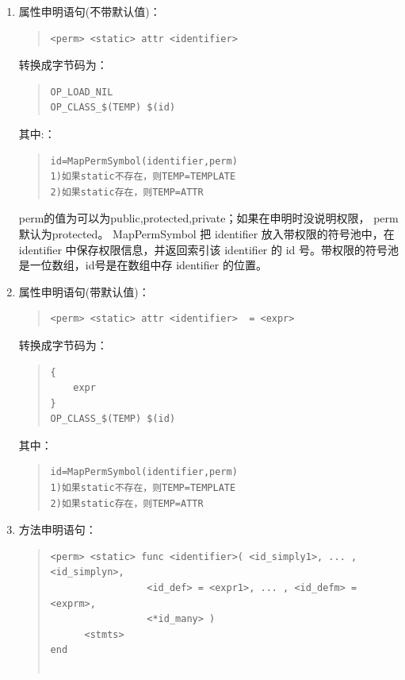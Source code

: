 \begin{enumerate}
\item 属性申明语句(不带默认值)：
\begin{quote}
\begin{verbatim}
<perm> <static> attr <identifier> 
\end{verbatim}
\end{quote}
转换成字节码为：
\begin{quote}
\begin{verbatim}
OP_LOAD_NIL
OP_CLASS_$(TEMP) $(id)
\end{verbatim}
\end{quote}
其中:：
\begin{quote}
\begin{verbatim}
id=MapPermSymbol(identifier,perm)
1)如果static不存在，则TEMP=TEMPLATE
2)如果static存在，则TEMP=ATTR
\end{verbatim}
\end{quote}
perm的值为可以为public,protected,private；如果在申明时没说明权限， perm 默认为protected。 MapPermSymbol 把 identifier 放入带权限的符号池中，在identifier 中保存权限信息，并返回索引该 identifier 的 id 号。带权限的符号池是一位数组，id号是在数组中存 identifier 的位置。


\item 属性申明语句(带默认值)：
\begin{quote}
\begin{verbatim}
<perm> <static> attr <identifier>  = <expr>
\end{verbatim}
\end{quote}
转换成字节码为：
\begin{quote}
\begin{verbatim}
{
    expr
}
OP_CLASS_$(TEMP) $(id)
\end{verbatim}
\end{quote}
其中：
\begin{quote}
\begin{verbatim}
id=MapPermSymbol(identifier,perm)
1)如果static不存在，则TEMP=TEMPLATE
2)如果static存在，则TEMP=ATTR
\end{verbatim}
\end{quote}


\item 方法申明语句：
\begin{quote}
\begin{verbatim}
<perm> <static> func <identifier>( <id_simply1>, ... ,<id_simplyn>,
                 <id_def> = <expr1>, ... , <id_defm> = <exprm>,
                 <*id_many> )
      <stmts>
end 
      

\end{verbatim}
\end{quote}
\end{enumerate}
